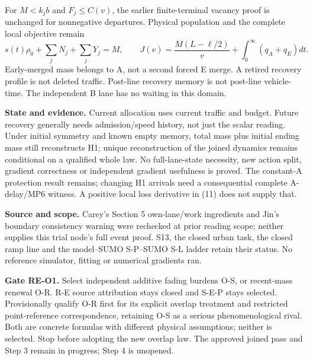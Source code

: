\documentclass[11pt,a4paper]{article}
\begin{document}
For $M<k_jb$ and $\dot F_j\leq C(v)$, the earlier finite-terminal vacancy
proof is unchanged for nonnegative departures. Physical population and
the complete local objective remain
\begin{equation}
 s(t)\rho_0+\sum_jN_j+\sum_jY_j=M,\qquad
 J(v)=\frac{M(L-\ell/2)}v+\int_0^\infty(q_A+q_E)dt. \tag{24}
\end{equation}
Early-merged mass belongs to A, not a second forced E merge. A retired
recovery profile is not deleted traffic. Post-line recovery memory is not
post-line vehicle-time. The independent B lane has no waiting in this domain.

\textbf{State and evidence.} Current allocation uses current traffic and
budget. Future recovery generally needs admission/speed history, not just
the scalar reading. Under initial symmetry and known empty memory, total
mass plus initial ending mass still reconstructs H1; unique reconstruction
of the joined dynamics remains conditional on a qualified whole law.
No full-lane-state necessity, new action split, gradient correctness or
independent gradient usefulness is proved. The constant-A protection result
remains; changing H1 arrivals need a consequential complete A-delay/MP6
witness. A positive local loss derivative in (11) does not supply that.

\textbf{Source and scope.} Carey's Section 5 own-lane/work ingredients and
Jin's boundary consistency warning were rechecked at prior reading scope;
neither supplies this trial node's full event proof. S13, the closed urban
task, the closed ramp line and the model--SUMO S-P--SUMO S-L ladder retain
their status. No reference simulator, fitting or numerical gradients ran.

\textbf{Gate RE-O1.} Select independent additive fading burdens O-S, or
recent-mass renewal O-R. R-E source attribution stays closed and S-E-P stays
selected. Provisionally qualify O-R first for its explicit overlap treatment
and restricted point-reference correspondence, retaining O-S as a serious
phenomenological rival. Both are concrete formulas with different physical
assumptions; neither is selected. Stop before adopting the new overlap law.
The approved joined pass and Step 3 remain in progress; Step 4 is unopened.
\end{document}
